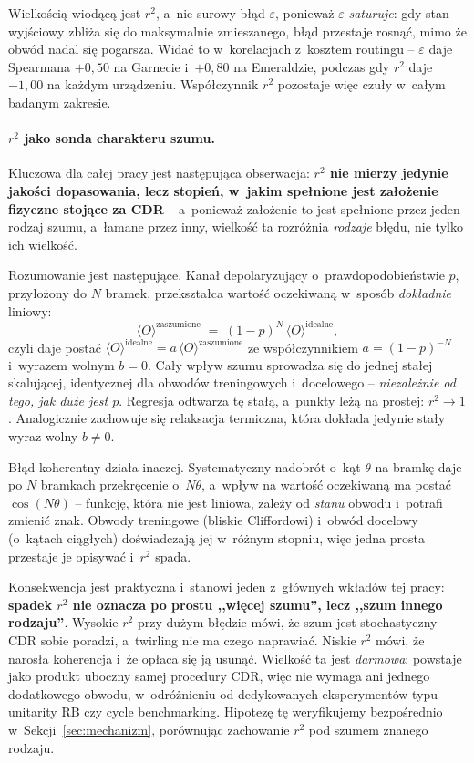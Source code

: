 \documentclass[11pt]{article}
\newcommand{\expv}{\langle O\rangle}
\begin{document}
Wielkością wiodącą jest $r^2$, a~nie surowy błąd $\varepsilon$, ponieważ $\varepsilon$
\emph{saturuje}: gdy stan wyjściowy zbliża się do maksymalnie zmieszanego, błąd przestaje rosnąć,
mimo że obwód nadal się pogarsza. Widać to w~korelacjach z~kosztem routingu -- $\varepsilon$ daje
Spearmana $+0{,}50$ na Garnecie i~$+0{,}80$ na Emeraldzie, podczas gdy $r^2$ daje $-1{,}00$ na
każdym urządzeniu. Współczynnik $r^2$ pozostaje więc czuły w~całym badanym zakresie.

\paragraph{\texorpdfstring{$r^2$}{r2} jako sonda charakteru szumu.} Kluczowa dla całej pracy jest
następująca obserwacja: \textbf{$r^2$ nie mierzy jedynie jakości dopasowania, lecz stopień, w~jakim
spełnione jest założenie fizyczne stojące za CDR} -- a~ponieważ założenie to jest spełnione przez
jeden rodzaj szumu, a~łamane przez inny, wielkość ta rozróżnia \emph{rodzaje} błędu, nie tylko ich
wielkość.

Rozumowanie jest następujące. Kanał depolaryzujący o~prawdopodobieństwie $p$, przyłożony do $N$
bramek, przekształca wartość oczekiwaną w~sposób \emph{dokładnie} liniowy:
\begin{equation}
  \expv^{\text{zaszumione}} \;=\; (1-p)^{N}\,\expv^{\text{idealne}} ,
  \label{eq:dep-linear}
\end{equation}
czyli daje postać $\expv^{\text{idealne}} = a\,\expv^{\text{zaszumione}}$ ze współczynnikiem
$a=(1-p)^{-N}$ i~wyrazem wolnym $b=0$. Cały wpływ szumu sprowadza się do jednej stałej skalującej,
identycznej dla obwodów treningowych i~docelowego -- \emph{niezależnie od tego, jak duże jest $p$}.
Regresja odtwarza tę stałą, a~punkty leżą na prostej: $r^2 \to 1$. Analogicznie zachowuje się
relaksacja termiczna, która dokłada jedynie stały wyraz wolny $b \neq 0$.

Błąd koherentny działa inaczej. Systematyczny nadobrót o~kąt $\theta$ na bramkę daje po $N$ bramkach
przekręcenie o~$N\theta$, a~wpływ na wartość oczekiwaną ma postać $\cos(N\theta)$ -- funkcję, która
nie jest liniowa, zależy od \emph{stanu} obwodu i~potrafi zmienić znak. Obwody treningowe (bliskie
Cliffordowi) i~obwód docelowy (o~kątach ciągłych) doświadczają jej w~różnym stopniu, więc jedna
prosta przestaje je opisywać i~$r^2$ spada.

Konsekwencja jest praktyczna i~stanowi jeden z~głównych wkładów tej pracy: \textbf{spadek $r^2$ nie
oznacza po prostu ,,więcej szumu'', lecz ,,szum innego rodzaju''}. Wysokie $r^2$ przy dużym błędzie
mówi, że szum jest stochastyczny -- CDR sobie poradzi, a~twirling nie ma czego naprawiać. Niskie
$r^2$ mówi, że narosła koherencja i~że opłaca się ją usunąć. Wielkość ta jest
\emph{darmowa}: powstaje jako produkt uboczny samej procedury CDR, więc nie wymaga ani jednego
dodatkowego obwodu, w~odróżnieniu od dedykowanych eksperymentów typu unitarity RB czy cycle
benchmarking. Hipotezę tę weryfikujemy bezpośrednio w~Sekcji~\ref{sec:mechanizm}, porównując
zachowanie $r^2$ pod szumem znanego rodzaju.
\end{document}
